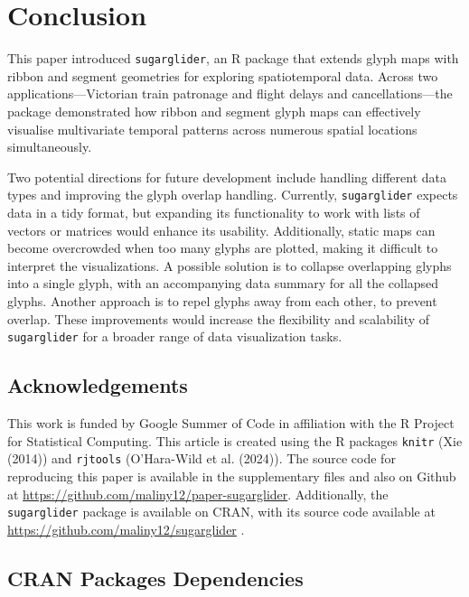 \hypertarget{conclusion}{%
\section{Conclusion}\label{conclusion}}

This paper introduced \texttt{sugarglider}, an R package that extends glyph maps with ribbon and segment geometries for exploring spatiotemporal data. Across two applications---Victorian train patronage and flight delays and cancellations---the package demonstrated how ribbon and segment glyph maps can effectively visualise multivariate temporal patterns across numerous spatial locations simultaneously.

Two potential directions for future development include handling different data types and improving the glyph overlap handling. Currently, \texttt{sugarglider} expects data in a tidy format, but expanding its functionality to work with lists of vectors or matrices would enhance its usability. Additionally, static maps can become overcrowded when too many glyphs are plotted, making it difficult to interpret the visualizations. A possible solution is to collapse overlapping glyphs into a single glyph, with an accompanying data summary for all the collapsed glyphs. Another approach is to repel glyphs away from each other, to prevent overlap. These improvements would increase the flexibility and scalability of \texttt{sugarglider} for a broader range of data visualization tasks.

\hypertarget{acknowledgements}{%
\subsection{Acknowledgements}\label{acknowledgements}}

This work is funded by Google Summer of Code in affiliation with the R Project for Statistical Computing. This article is created using the R packages \texttt{knitr} (Xie (2014)) and \texttt{rjtools} (O'Hara-Wild et al. (2024)). The source code for reproducing this paper is available in the supplementary files and also on Github at \url{https://github.com/maliny12/paper-sugarglider}. Additionally, the \texttt{sugarglider} package is available on CRAN, with its source code available at \url{https://github.com/maliny12/sugarglider} .

\hypertarget{cran-packages-dependencies}{%
\subsection{CRAN Packages Dependencies}\label{cran-packages-dependencies}}

